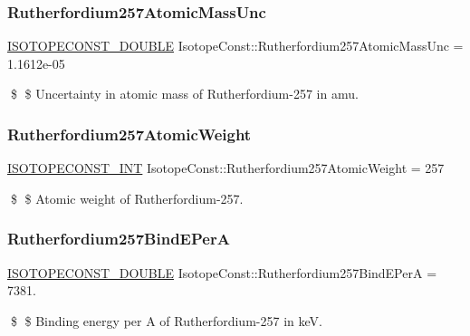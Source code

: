 \subsubsection{\texorpdfstring{Rutherfordium257\+Atomic\+Mass\+Unc}{Rutherfordium257AtomicMassUnc}}
{\footnotesize\ttfamily \mbox{\hyperlink{group___isotope_const-_macros_ga8f45a7272ce02c0b4c65c44636ed719a}{I\+S\+O\+T\+O\+P\+E\+C\+O\+N\+S\+T\+\_\+\+D\+O\+U\+B\+LE}} Isotope\+Const\+::\+Rutherfordium257\+Atomic\+Mass\+Unc = 1.\+1612e-\/05}

\$ \$ Uncertainty in atomic mass of Rutherfordium-\/257 in amu. \mbox{\label{group___isotope_const-_rutherfordium-_rf257_gac30684515c68a42fa5930ffdb4f3115f}} 
\subsubsection{\texorpdfstring{Rutherfordium257\+Atomic\+Weight}{Rutherfordium257AtomicWeight}}
{\footnotesize\ttfamily \mbox{\hyperlink{group___isotope_const-_macros_ga5f18360b3e99483a35c32d789e62621c}{I\+S\+O\+T\+O\+P\+E\+C\+O\+N\+S\+T\+\_\+\+I\+NT}} Isotope\+Const\+::\+Rutherfordium257\+Atomic\+Weight = 257}

\$ \$ Atomic weight of Rutherfordium-\/257. \mbox{\label{group___isotope_const-_rutherfordium-_rf257_ga90ff258ddd3ce8212403c826bfffb1e3}} 
\subsubsection{\texorpdfstring{Rutherfordium257\+Bind\+E\+PerA}{Rutherfordium257BindEPerA}}
{\footnotesize\ttfamily \mbox{\hyperlink{group___isotope_const-_macros_ga8f45a7272ce02c0b4c65c44636ed719a}{I\+S\+O\+T\+O\+P\+E\+C\+O\+N\+S\+T\+\_\+\+D\+O\+U\+B\+LE}} Isotope\+Const\+::\+Rutherfordium257\+Bind\+E\+PerA = 7381.}

\$ \$ Binding energy per A of Rutherfordium-\/257 in keV. \mbox{\label{group___isotope_const-_rutherfordium-_rf257_ga64cb0badd858c09c0920681189d11c95}} 
